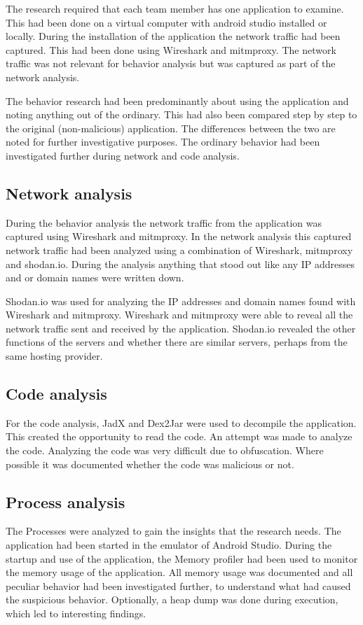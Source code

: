 The research required that each team member has one application to examine.
This had been done on a virtual computer with android studio installed or locally.
During the installation of the application the network traffic had been captured.
This had been done using Wireshark and mitmproxy.
The network traffic was not relevant for behavior analysis but was captured as part of the network analysis.

The behavior research had been predominantly about using the application and noting anything out of the ordinary.
This had also been compared step by step to the original (non-malicious) application.
The differences between the two are noted for further investigative purposes.
The ordinary behavior had been investigated further during network and code analysis.

\subsection{Network analysis}

During the behavior analysis the network traffic from the application was captured using Wireshark and mitmproxy.
In the network analysis this captured network traffic had been analyzed using a combination of Wireshark, mitmproxy and shodan.io.
During the analysis anything that stood out like any IP addresses and or domain names were written down.

Shodan.io was used for analyzing the IP addresses and domain names found with Wireshark and mitmproxy.
Wireshark and mitmproxy were able to reveal all the network traffic sent and received by the application.
Shodan.io revealed the other functions of the servers and whether there are similar servers, perhaps from the same hosting provider.

\subsection{Code analysis}

For the code analysis, JadX and Dex2Jar were used to decompile the application.
This created the opportunity to read the code.
An attempt was made to analyze the code.
Analyzing the code was very difficult due to obfuscation.
Where possible it was documented whether the code was malicious or not.

\subsection{Process analysis}
The Processes were analyzed to gain the insights that the research needs.
The application had been started in the emulator of Android Studio.
During the startup and use of the application, the Memory profiler had been used to monitor the memory usage of the application.
All memory usage was documented and all peculiar behavior had been investigated further, to understand what had caused the suspicious behavior.
Optionally, a heap dump was done during execution, which led to interesting findings.


